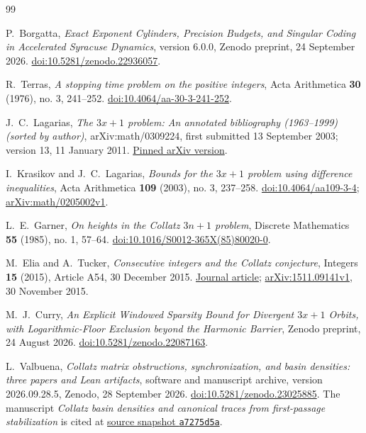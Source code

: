 \begingroup\small
\begin{thebibliography}{99}
\raggedright

P.~Borgatta, \emph{Exact Exponent Cylinders, Precision Budgets, and Singular
Coding in Accelerated Syracuse Dynamics}, version 6.0.0, Zenodo preprint,
24 September 2026.
\href{https://doi.org/10.5281/zenodo.22936057}{doi:10.5281/zenodo.22936057}.

R.~Terras, \emph{A stopping time problem on the positive integers},
Acta Arithmetica \textbf{30} (1976), no. 3, 241--252.
\href{https://doi.org/10.4064/aa-30-3-241-252}{doi:10.4064/aa-30-3-241-252}.

J.~C.~Lagarias, \emph{The $3x+1$ problem: An annotated bibliography
(1963--1999) (sorted by author)}, arXiv:math/0309224,
first submitted 13 September 2003; version 13, 11 January 2011.
\href{https://arxiv.org/abs/math/0309224v13}{Pinned arXiv version}.

I.~Krasikov and J.~C.~Lagarias, \emph{Bounds for the $3x+1$ problem using
difference inequalities}, Acta Arithmetica \textbf{109} (2003), no. 3,
237--258.
\href{https://doi.org/10.4064/aa109-3-4}{doi:10.4064/aa109-3-4};
\href{https://arxiv.org/abs/math/0205002v1}{arXiv:math/0205002v1}.

L.~E.~Garner, \emph{On heights in the Collatz $3n+1$ problem},
Discrete Mathematics \textbf{55} (1985), no. 1, 57--64.
\href{https://doi.org/10.1016/S0012-365X(85)80020-0}{doi:10.1016/S0012-365X(85)80020-0}.

M.~Elia and A.~Tucker, \emph{Consecutive integers and the Collatz conjecture},
Integers \textbf{15} (2015), Article A54, 30 December 2015.
\href{https://math.colgate.edu/~integers/p54/p54.pdf}{Journal article};
\href{https://arxiv.org/abs/1511.09141v1}{arXiv:1511.09141v1},
30 November 2015.

M.~J.~Curry, \emph{An Explicit Windowed Sparsity Bound for Divergent
$3x+1$ Orbits, with Logarithmic-Floor Exclusion beyond the Harmonic
Barrier}, Zenodo preprint, 24 August 2026.
\href{https://doi.org/10.5281/zenodo.22087163}{doi:10.5281/zenodo.22087163}.

L.~Valbuena, \emph{Collatz matrix obstructions, synchronization, and basin
densities: three papers and Lean artifacts}, software and manuscript
archive, version 2026.09.28.5, Zenodo, 28 September 2026.
\href{https://doi.org/10.5281/zenodo.23025885}{doi:10.5281/zenodo.23025885}.
The manuscript \emph{Collatz basin densities and canonical traces from
first-passage stabilization} is cited at
\href{https://github.com/x1xhlol/collatz-two-coordinate-obstruction/blob/a7275d5a73814d3d9a400c6fe6577de9542b03a3/paper/tao-basin-densities.tex}{source snapshot \texttt{a7275d5a}}.


\end{thebibliography}
